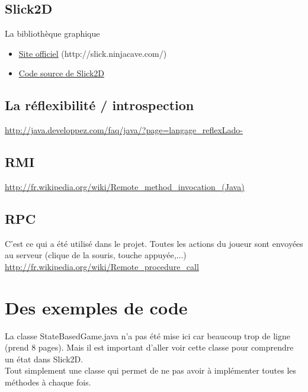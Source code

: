 \documentclass{report}
\begin{document}
\section{Slick2D}
La bibliothèque graphique\\
\begin{itemize}
\item \href{http://slick.ninjacave.com/}{Site officiel} (http://slick.ninjacave.com/)
\item \href{https://bitbucket.org/kevglass/slick/src/9d7443ec33af/trunk/Slick/}{Code source de Slick2D}
\end{itemize}
\section{La réflexibilité / introspection}
\url{http://java.developpez.com/faq/java/?page=langage_reflexLado-}

\section{RMI}
\url{http://fr.wikipedia.org/wiki/Remote_method_invocation_(Java)}
\section{RPC}
C'est ce qui a été utilisé dans le projet. Toutes les actions du joueur sont envoyées au serveur (clique de la souris, touche appuyée,...)\\
\url{http://fr.wikipedia.org/wiki/Remote_procedure_call}

\chapter{Des exemples de code}
\label {StateBasedGame}
La classe StateBasedGame.java n'a pas été mise ici car beaucoup trop de ligne (prend 8 pages). Mais il est important d'aller voir cette classe pour comprendre un état dans Slick2D.\\



Tout simplement une classe qui permet de ne pas avoir à implémenter toutes les méthodes à chaque fois.
 \label {BasicGameState}
\end{document}
